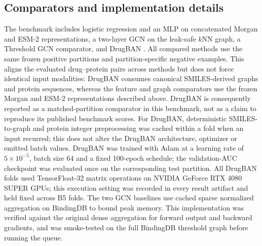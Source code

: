 \subsection{Comparators and implementation details}
The benchmark includes logistic regression and an MLP on concatenated Morgan
and ESM-2 representations, a two-layer GCN on the leak-safe $k$NN graph, a
Threshold GCN comparator, and DrugBAN
\cite{ozturk2018deepdta,nguyen2021graphdta,bai2023drugban}. All compared methods
use the same frozen positive partitions and partition-specific negative
examples. This aligns the evaluated drug--protein pairs across methods but
does not force identical input modalities: DrugBAN consumes canonical
SMILES-derived graphs and protein sequences, whereas the feature and graph
comparators use the frozen Morgan and ESM-2 representations described above.
DrugBAN is consequently reported as a matched-partition comparator in this
benchmark, not as a claim to reproduce its published benchmark scores.
For DrugBAN, deterministic SMILES-to-graph and protein integer
preprocessing was cached within a fold when an input recurred; this does not
alter the DrugBAN architecture, optimizer or emitted batch values. DrugBAN was
trained with Adam at a learning rate of $5\times10^{-5}$, batch size 64 and a
fixed 100-epoch schedule; the validation-AUC checkpoint was evaluated once on
the corresponding test partition. All DrugBAN folds used TensorFloat-32 matrix
operations on NVIDIA GeForce RTX 4080 SUPER GPUs; this execution setting was
recorded in every
result artifact and held fixed across B5 folds.
The two GCN baselines use cached sparse normalized aggregation on BindingDB to
bound peak memory. This implementation was verified against the original dense
aggregation for forward output and backward gradients, and was smoke-tested on
the full BindingDB threshold graph before running the queue.
